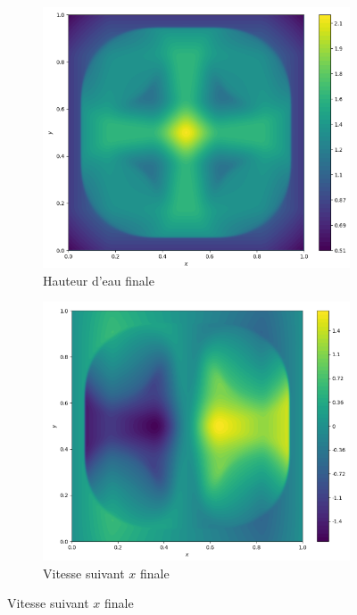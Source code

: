\documentclass[
	french,
	11pt, %
]{fphw}
\begin{document}
\begin{figure}[H]
\begin{subfigure}{0.45\textwidth}
	\end{subfigure}
	\begin{subfigure}{0.32\textwidth}
		\centering
		\includegraphics[width=\textwidth,height=0.85\textwidth]{Bonus1h.png}
		\caption{Hauteur d'eau finale}
		\label{fig:Bonus1h}
	\end{subfigure}
	\begin{subfigure}{0.32\textwidth}
		\centering
		\includegraphics[width=\textwidth,height=0.85\textwidth]{Bonus1u.png}
		\caption{Vitesse suivant $x$ finale}

\end{subfigure}
\end{figure}
\end{document}
